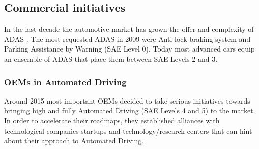 \subsection{Commercial initiatives}

In the last decade the automotive market has grown the offer and complexity
of ADAS \cite{Perez2016}. The most requested ADAS in 2009
\cite{Frost&Sullivan2010} were Anti-lock braking system and Parking Assistance
by Warning (SAE Level 0). Today most advanced cars equip an ensemble of
ADAS that place them between SAE Levels 2 and 3. 

\subsubsection{OEMs in Automated Driving}
\label{sec:oem-ad}

Around 2015 most important OEMs decided to take serious initiatives towards
bringing high and fully Automated Driving (SAE Levels 4 and 5) to the market.
In order to accelerate their roadmaps, they established alliances with
technological companies startups and technology/research centers that
can hint about their approach to Automated Driving.




